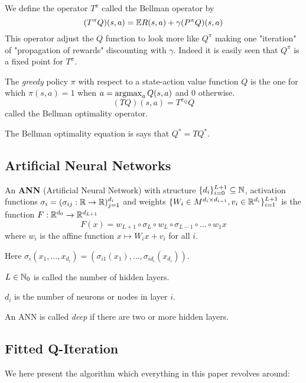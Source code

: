 We define the operator $T^\pi$ called the Bellman operator by
\[ (T^\pi Q)(s, a) = \mathbb{E} R(s, a) + \gamma (P^\pi Q)(s, a) \]
This operator adjust the $Q$ function to look more like $Q^\pi$ making one
"iteration" of "propagation of rewards" discounting with $\gamma$.
Indeed it is easily seen that $Q^\pi$ is a fixed point for $T^\pi$.

The \emph{greedy} policy $\pi$ with respect to a state-action value function
$Q$ is the one for which $\pi(s,a) = 1$ when $a = \operatorname*{argmax}_a Q(s,a)$
and 0 otherwise.
\[ (T Q)(s, a) = T^{\pi_Q} Q \]
called the Bellman optimality operator.

The Bellman optimality equation is says that $Q^* = TQ^*$.

\subsection{Artificial Neural Networks}

\begin{Definition}\label{def_ANN}
	An \textbf{ANN} (Artificial Neural Network) with structure
	$\{ d_i \}_{i=0}^{L+1} \subseteq \mathbb{N}$,
	activation functions $\sigma_i = (\sigma_{ij} : \mathbb{R} \to \mathbb{R})_{j=1}^{d_i}$
	and weights $\{ W_i \in M^{d_i \times d_{i-1}}, v_i \in \mathbb{R}^{d_i} \}_{i=1}^{L+1}$
	is the function $F:\mathbb{R}^{d_0} \to \mathbb{R}^{d_{L+1}}$ 
	\[ F(x) = w_{L+1} \circ \sigma_L \circ w_L \circ \sigma_{L-1} \circ \dots \circ w_1 x \]
	where $w_i$ is the affine function $x \mapsto W_i x + v_i$ for all $i$.

	Here $\sigma_i(x_1, \dots, x_{d_i})
	= (\sigma_{i1}(x_1), \dots, \sigma_{id_{i}}(x_{d_{i}}))$.

	$L \in \mathbb{N}_0$ is called the number of hidden layers.

	$d_i$ is the number of neurons or nodes in layer $i$.
\end{Definition}

An ANN is called \emph{deep} if there are two or more hidden layers.

\subsection{Fitted Q-Iteration}

We here present the algorithm which everything in this paper revolves around:

